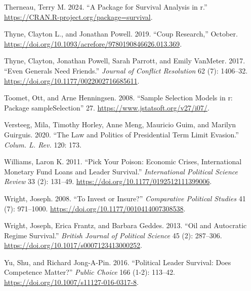 \documentclass[
  12pt,
]{report}
\newlength{\cslhangindent}
\newenvironment{CSLReferences}[2] %
 {\begin{list}{}{%
  \setlength{\itemindent}{0pt}
  \setlength{\leftmargin}{0pt}
  \setlength{\parsep}{0pt}
  \ifodd #1
   \setlength{\leftmargin}{\cslhangindent}
   \setlength{\itemindent}{-1\cslhangindent}
  \fi
  \setlength{\itemsep}{#2\baselineskip}}}
 {\end{list}}
\begin{document}
\begin{CSLReferences}{1}{0}
Therneau, Terry M. 2024. {``A Package for Survival Analysis in r.''}
\url{https://CRAN.R-project.org/package=survival}.

Thyne, Clayton L., and Jonathan Powell. 2019. {``Coup Research,''}
October. \url{https://doi.org/10.1093/acrefore/9780190846626.013.369}.

Thyne, Clayton, Jonathan Powell, Sarah Parrott, and Emily VanMeter.
2017. {``Even Generals Need Friends.''} \emph{Journal of Conflict
Resolution} 62 (7): 1406--32.
\url{https://doi.org/10.1177/0022002716685611}.

Toomet, Ott, and Arne Henningsen. 2008. {``Sample Selection Models in
{\textbraceleft}r{\textbraceright}: Package
{\textbraceleft}sampleSelection{\textbraceright}''} 27.
\url{https://www.jstatsoft.org/v27/i07/}.

Versteeg, Mila, Timothy Horley, Anne Meng, Mauricio Guim, and Marilyn
Guirguis. 2020. {``The Law and Politics of Presidential Term Limit
Evasion.''} \emph{Colum. L. Rev.} 120: 173.

Williams, Laron K. 2011. {``Pick Your Poison: Economic Crises,
International Monetary Fund Loans and Leader Survival.''}
\emph{International Political Science Review} 33 (2): 131--49.
\url{https://doi.org/10.1177/0192512111399006}.

Wright, Joseph. 2008. {``To Invest or Insure?''} \emph{Comparative
Political Studies} 41 (7): 971--1000.
\url{https://doi.org/10.1177/0010414007308538}.

Wright, Joseph, Erica Frantz, and Barbara Geddes. 2013. {``Oil and
Autocratic Regime Survival.''} \emph{British Journal of Political
Science} 45 (2): 287--306.
\url{https://doi.org/10.1017/s0007123413000252}.

Yu, Shu, and Richard Jong-A-Pin. 2016. {``Political Leader Survival:
Does Competence Matter?''} \emph{Public Choice} 166 (1-2): 113--42.
\url{https://doi.org/10.1007/s11127-016-0317-8}.

\end{CSLReferences}
\end{document}
